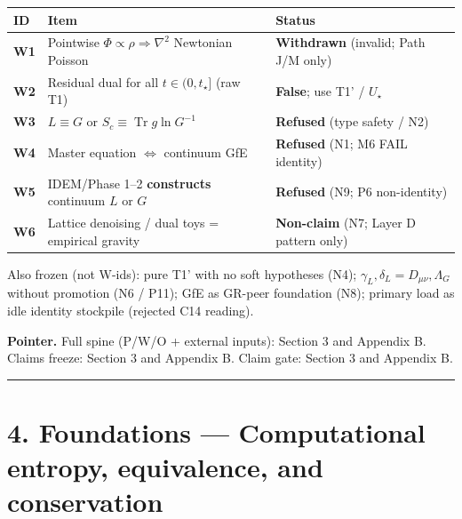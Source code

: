 \documentclass[
  11pt,
]{article}
\newcounter{none} %
\begin{document}
{\def\LTcaptype{none} %
\begin{longtable}[]{@{}
  >{\raggedright\arraybackslash}p{}
  >{\raggedright\arraybackslash}p{}
  >{\raggedright\arraybackslash}p{}@{}}
\toprule\noalign{}
\begin{minipage}[b]{\linewidth}\raggedright
ID
\end{minipage} & \begin{minipage}[b]{\linewidth}\raggedright
Item
\end{minipage} & \begin{minipage}[b]{\linewidth}\raggedright
Status
\end{minipage} \\
\midrule\noalign{}
\endhead
\bottomrule\noalign{}
\endlastfoot
\textbf{W1} & Pointwise \(\Phi\propto\rho\Rightarrow\nabla^2\) Newtonian
Poisson & \textbf{Withdrawn} (invalid; Path J/M only) \\
\textbf{W2} & Residual dual for all \(t\in(0,t_\star]\) (raw T1) &
\textbf{False}; use T1' / \(U_\star\) \\
\textbf{W3} & \(L\equiv G\) or
\(S_c\equiv\operatorname{Tr} g\ln G^{-1}\) & \textbf{Refused} (type
safety / N2) \\
\textbf{W4} & Master equation \(\Leftrightarrow\) continuum GfE &
\textbf{Refused} (N1; M6 FAIL identity) \\
\textbf{W5} & IDEM/Phase 1--2 \textbf{constructs} continuum \(L\) or
\(G\) & \textbf{Refused} (N9; P6 non-identity) \\
\textbf{W6} & Lattice denoising / dual toys = empirical gravity &
\textbf{Non-claim} (N7; Layer D pattern only) \\
\end{longtable}
}

Also frozen (not W-ids): pure T1' with no soft hypotheses (N4);
\(\gamma_L,\delta_L=D_{\mu\nu},\Lambda_G\) without promotion (N6 / P11);
GfE as GR-peer foundation (N8); primary load as idle identity stockpile
(rejected C14 reading).

\textbf{Pointer.} Full spine (P/W/O + external inputs): Section 3 and
Appendix B. Claims freeze: Section 3 and Appendix B. Claim gate: Section
3 and Appendix B.

\begin{center}\rule{0.5\linewidth}{0.5pt}\end{center}

\section{4. Foundations --- Computational entropy, equivalence, and
conservation}\label{foundations-computational-entropy-equivalence-and-conservation}
\end{document}
